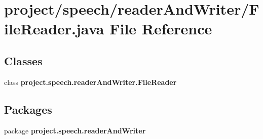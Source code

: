 \section{project/speech/reader\+And\+Writer/\+File\+Reader.java File Reference}
\label{_file_reader_8java}
\subsection*{Classes}
\begin{DoxyCompactItemize}
\item 
class {\bf project.\+speech.\+reader\+And\+Writer.\+File\+Reader}
\end{DoxyCompactItemize}
\subsection*{Packages}
\begin{DoxyCompactItemize}
\item 
package {\bf project.\+speech.\+reader\+And\+Writer}
\end{DoxyCompactItemize}
